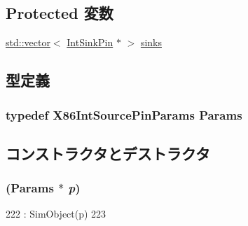 \subsection*{Protected 変数}
\begin{DoxyCompactItemize}
\item 
\hyperlink{classstd_1_1vector}{std::vector}$<$ \hyperlink{classX86ISA_1_1IntSinkPin}{IntSinkPin} $\ast$ $>$ \hyperlink{classX86ISA_1_1IntSourcePin_a90a62b49a8d8eddd12ecfc48b5ae3cac}{sinks}
\end{DoxyCompactItemize}


\subsection{型定義}
\hypertarget{classX86ISA_1_1IntSourcePin_aa726887946ee64861aed7d5a9e2f240a}{
\subsubsection[{Params}]{\setlength{\rightskip}{0pt plus 5cm}typedef X86IntSourcePinParams {\bf Params}}}
\label{classX86ISA_1_1IntSourcePin_aa726887946ee64861aed7d5a9e2f240a}


\subsection{コンストラクタとデストラクタ}
\hypertarget{classX86ISA_1_1IntSourcePin_a7fd9666d5032b7a1a9687c8e3a9149bd}{
\subsubsection[{IntSourcePin}]{ ({\bf Params} $\ast$ {\em p})}}
\label{classX86ISA_1_1IntSourcePin_a7fd9666d5032b7a1a9687c8e3a9149bd}



\begin{DoxyCode}
222                             : SimObject(p)
223     {}
\end{DoxyCode}


